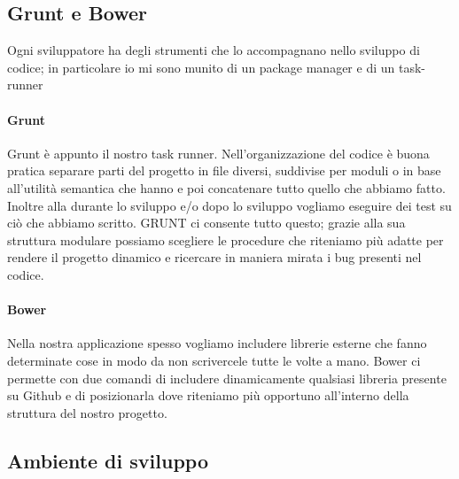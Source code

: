 \subsection{Grunt e Bower}
Ogni sviluppatore ha degli strumenti che lo accompagnano nello sviluppo di codice; in particolare io mi sono munito di un package manager e di un task-runner
\paragraph*{Grunt}
Grunt è appunto il nostro task runner. Nell'organizzazione del codice è buona pratica separare parti del progetto in file diversi, suddivise per moduli o in base all'utilità semantica che hanno e poi concatenare tutto quello che abbiamo fatto. Inoltre alla durante lo sviluppo e/o dopo lo sviluppo vogliamo eseguire dei test su ciò che abbiamo scritto. GRUNT ci consente tutto questo; grazie alla sua struttura modulare possiamo scegliere le procedure che riteniamo più adatte per rendere il progetto dinamico e ricercare in maniera mirata i bug presenti nel codice.
\paragraph*{Bower}
Nella nostra applicazione spesso vogliamo includere librerie esterne che fanno determinate cose in modo da non scrivercele tutte le volte a mano. Bower ci permette con due comandi di includere dinamicamente qualsiasi libreria presente su Github e di posizionarla dove riteniamo più opportuno all'interno della struttura del nostro progetto.
\subsection{Ambiente di sviluppo}